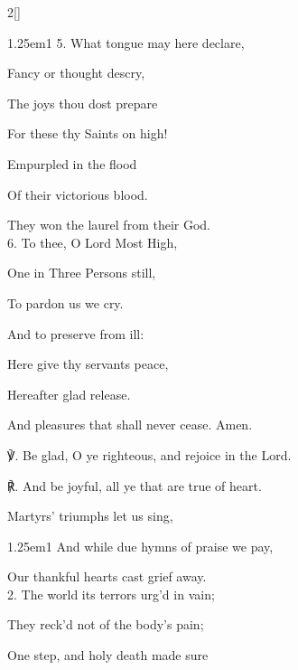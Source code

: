 \begin{paracol}{2}[]
\begin{hangparas}{1.25em}{1}
5. What tongue may here declare, 

Fancy or thought descry,

The joys thou dost prepare 

For these thy Saints on high!

Empurpled in the flood

Of their victorious blood.

They won the laurel from their God.\\

6. To thee, O Lord Most High,

One in Three Persons still,

To pardon us we cry.

And to preserve from ill:

Here give thy servants peace,

Hereafter glad release. 

And pleasures that shall never cease. Amen.\\
\end{hangparas}

℣. Be glad, O ye righteous, and rejoice in the Lord.

℟. And be joyful, all ye that are true of heart.


\switchcolumn

\mattins


\mattinsInvitatoryHymn\label{MartyrsInvitatory}

 Martyrs' triumphs let us sing,


\begin{hangparas}{1.25em}{1}
And while due hymns of praise we pay,

Our thankful hearts cast grief away.\\

2. The world its terrors urg'd in vain;

They reck'd not of the body's pain;

One step, and holy death made sure


\end{hangparas}
\end{paracol}
